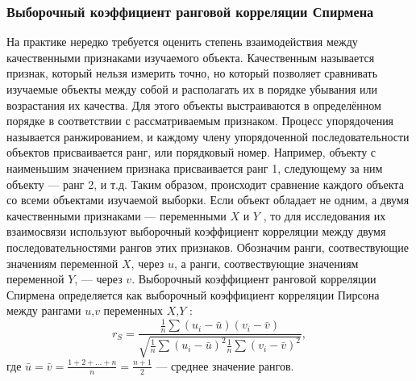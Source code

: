 \documentclass[a4paper]{article}
\begin{document}
\subsubsection{Выборочный коэффициент ранговой корреляции Спирмена}
\noindent На практике нередко требуется оценить степень взаимодействия между качественными признаками изучаемого объекта. Качественным называется признак, который нельзя измерить точно, но который позволяет сравнивать изучаемые объекты между собой и располагать их в порядке убывания или возрастания их качества. Для этого объекты выстраиваются в определённом порядке в соответствии с рассматриваемым признаком. Процесс упорядочения называется ранжированием, и каждому члену упорядоченной последовательности объектов присваивается ранг, или порядковый номер. Например, объекту с наименьшим значением признака присваивается ранг 1, следующему за ним объекту — ранг 2, и т.д. Таким образом, происходит сравнение каждого объекта со всеми объектами изучаемой выборки.
\newline
Если объект обладает не одним, а двумя качественными признаками — переменными $X$ и $Y$ , то для исследования их взаимосвязи используют выборочный коэффициент корреляции между двумя последовательностями рангов этих признаков.
\newline
Обозначим ранги, соотвествующие значениям переменной $X$, через $u$, а ранги, соотвествующие значениям переменной $Y$, — через $v$.
\newline
Выборочный коэффициент ранговой корреляции Спирмена определяется как выборочный коэффициент корреляции Пирсона между рангами $u$,$v$ переменных $X$,$Y$ :
\begin{equation}
r_{S} = \frac{
	\frac{1}{n}\sum{(u_{i} - \bar{u})(v_{i}-\bar{v})}
}{
	\sqrt{\frac{1}{n}\sum{(u_{i} - \bar{u})^{2}}\frac{1}{n}\sum{(v_{i} - \bar{v})^{2}}}
},
\label{rS}
\end{equation}
где $\bar{u} = \bar{v} = \frac{1 + 2 + ... + n}{n} = \frac{n + 1}{2}$ — среднее значение рангов.
\end{document}
